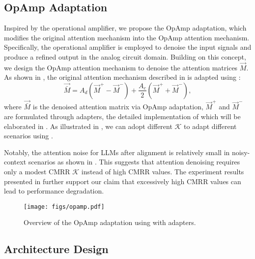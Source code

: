 \subsection{OpAmp Adaptation}  
Inspired by the operational amplifier, we propose the OpAmp adaptation, which modifies the original attention mechanism into the OpAmp attention mechanism. 
Specifically, the operational amplifier is employed to denoise the input signals and produce a refined output in the analog circuit domain. 
Building on this concept, we design the OpAmp attention mechanism to denoise the attention matrices $\vec{M}$. 
As shown in , the original attention mechanism described in  is adapted using :
\begin{equation}
    \vec{\bar{M}} = A_{d}(\vec{M}^{+} - \vec{M}^{-}) + \frac{A_{c}}{2}(\vec{M}^{+} + \vec{M}^{-}),
\label{eq:opampattn}   
\end{equation}
where $\vec{\bar{M}}$ is the denoised attention matrix via OpAmp adaptation, $\vec{M}^{+}$ and $\vec{M}^{-}$ are formulated through adapters, the detailed implementation of which will be elaborated in .
As illustrated in , we can adopt different $\mathcal{K}$ to adapt different scenarios using .

Notably, the attention noise for LLMs after alignment is relatively small in noisy-context scenarios as shown in .
This suggests that attention denoising requires only a modest CMRR $\mathcal{K}$ instead of high CMRR values.
The experiment results presented in  further support our claim that excessively high CMRR values can lead to performance degradation. 
\begin{figure}[!tb]
    \centering
    \texttt{[image: figs/opamp.pdf]} 
    \caption{Overview of the OpAmp adaptation using  with adapters.} 
    \label{fig:opamp}
\end{figure}

\subsection{Architecture Design}
\label{sec:arch_des}

